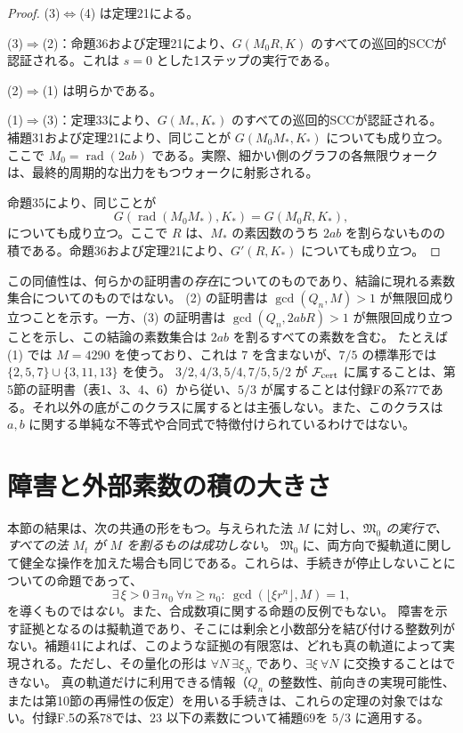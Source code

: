\documentclass[11pt,reqno]{amsart}
\theoremstyle{definition}
\theoremstyle{definition}
\theoremstyle{remark}
\begin{document}
\begin{proof}\leavevmode\label{proof:37}
(3)\(\Leftrightarrow\)(4) は定理21による。

(3)\(\Rightarrow\)(2)：命題36および定理21により、\(G(M_0R,K)\) のすべての巡回的SCCが認証される。これは \(s=0\) とした1ステップの実行である。

(2)\(\Rightarrow\)(1) は明らかである。

(1)\(\Rightarrow\)(3)：定理33により、\(G(M_*,K_*)\) のすべての巡回的SCCが認証される。
補題31および定理21により、同じことが \(G(M_0M_*,K_*)\) についても成り立つ。ここで \(M_0=\operatorname{rad}(2ab)\) である。実際、細かい側のグラフの各無限ウォークは、最終的周期的な出力をもつウォークに射影される。

命題35により、同じことが
\[
G(\operatorname{rad}(M_0M_*),K_*)=G(M_0R,K_*),
\]
についても成り立つ。ここで \(R\) は、\(M_*\) の素因数のうち \(2ab\) を割らないものの積である。命題36および定理21により、\(G'(R,K_*)\) についても成り立つ。\qedhere
\end{proof}

この同値性は、何らかの証明書の\emph{存在}についてのものであり、結論に現れる素数集合についてのものではない。
(2) の証明書は \(\gcd(Q_n,M)>1\) が無限回成り立つことを示す。一方、(3) の証明書は \(\gcd(Q_n,2abR)>1\) が無限回成り立つことを示し、この結論の素数集合は \(2ab\) を割るすべての素数を含む。
たとえば (1) では \(M=4290\) を使っており、これは \(7\) を含まないが、\(7/5\) の標準形では \(\{2,5,7\}\cup\{3,11,13\}\) を使う。
\(3/2,4/3,5/4,7/5,5/2\) が \(\mathcal F_{\rm cert}\) に属することは、第5節の証明書（表1、3、4、6）から従い、\(5/3\) が属することは付録Fの系77である。それ以外の底がこのクラスに属するとは主張しない。また、このクラスは \(a,b\) に関する単純な不等式や合同式で特徴付けられているわけではない。

\section{障害と外部素数の積の大きさ}\label{sec:8}

本節の結果は、次の共通の形をもつ。与えられた法 \(M\) に対し、\emph{\(\mathfrak M_0\) の実行で、すべての法 \(M_t\) が \(M\) を割るものは成功しない}。
\(\mathfrak M_0\) に、両方向で擬軌道に関して健全な操作を加えた場合も同じである。これらは、手続きが停止しないことについての命題であって、
\[
\exists\,\xi>0\ \exists\,n_0\ \forall n\ge n_0:\ \gcd(\lfloor\xi r^n\rfloor,M)=1,
\]
を導くものでは\emph{ない}。また、合成数項に関する命題の反例でもない。
障害を示す証拠となるのは擬軌道であり、そこには剰余と小数部分を結び付ける整数列がない。補題41によれば、このような証拠の有限窓は、どれも真の軌道によって実現される。ただし、その量化の形は \(\forall N\ \exists\xi_N\) であり、\(\exists\xi\ \forall N\) に交換することはできない。
真の軌道だけに利用できる情報（\(Q_n\) の整数性、前向きの実現可能性、または第10節の再帰性の仮定）を用いる手続きは、これらの定理の対象ではない。付録F.5の系78では、\(23\) 以下の素数について補題69を \(5/3\) に適用する。
\end{document}

